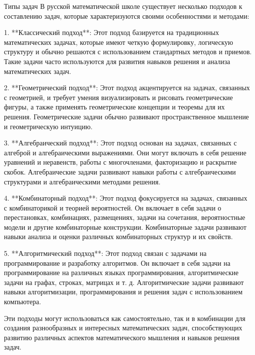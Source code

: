 Типы задач
В русской математической школе существует несколько подходов к составлению задач, которые характеризуются своими особенностями и методами:

1. **Классический подход**: Этот подход базируется на традиционных математических задачах, которые имеют четкую формулировку, логическую структуру и обычно решаются с использованием стандартных методов и приемов. Такие задачи часто используются для развития навыков решения и анализа математических задач.

2. **Геометрический подход**: Этот подход акцентируется на задачах, связанных с геометрией, и требует умения визуализировать и рисовать геометрические фигуры, а также применять геометрические концепции и теоремы для их решения. Геометрические задачи обычно развивают пространственное мышление и геометрическую интуицию.

3. **Алгебраический подход**: Этот подход основан на задачах, связанных с алгеброй и алгебраическими выражениями. Они могут включать в себя решение уравнений и неравенств, работы с многочленами, факторизацию и раскрытие скобок. Алгебраические задачи развивают навыки работы с алгебраическими структурами и алгебраическими методами решения.

4. **Комбинаторный подход**: Этот подход фокусируется на задачах, связанных с комбинаторикой и теорией вероятностей. Он включает в себя задачи о перестановках, комбинациях, размещениях, задачи на сочетания, вероятностные модели и другие комбинаторные конструкции. Комбинаторные задачи развивают навыки анализа и оценки различных комбинаторных структур и их свойств.

5. **Алгоритмический подход**: Этот подход связан с задачами на программирование и разработку алгоритмов. Он включает в себя задачи на программирование на различных языках программирования, алгоритмические задачи на графах, строках, матрицах и т. д. Алгоритмические задачи развивают навыки алгоритмизации, программирования и решения задач с использованием компьютера.

Эти подходы могут использоваться как самостоятельно, так и в комбинации для создания разнообразных и интересных математических задач, способствующих развитию различных аспектов математического мышления и навыков решения задач.

